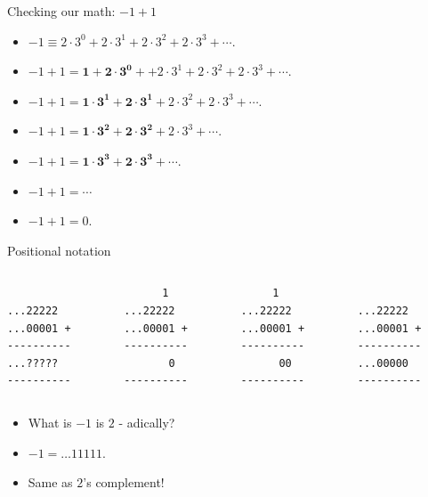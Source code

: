 \documentclass[8pt]{beamer}
\begin{document}
\begin{frame}[fragile]{Checking our math: $-1 + 1$}

\begin{itemize}
\item $-1 \equiv 2\cdot 3^0 + 2\cdot 3^1 + 2 \cdot 3^2 + 2 \cdot 3^3 + \cdots$. \pause
\item $-1 +1 = \mathbf{1 + 2\cdot 3^0} +   + 2\cdot 3^1 + 2 \cdot 3^2 + 2 \cdot 3^3 + \cdots$. \pause
\item $-1 +1 = \mathbf{1 \cdot 3^1 + 2\cdot 3^1} + 2 \cdot 3^2 + 2 \cdot 3^3 + \cdots$. \pause
\item $-1 +1 = \mathbf{1\cdot 3^2 + 2 \cdot 3^2} + 2 \cdot 3^3 + \cdots$. \pause
\item $-1 +1 = \mathbf{1\cdot 3^3 + 2 \cdot 3^3} + \cdots$. \pause
\item $-1 +1 = \cdots$ \pause
\item $-1 +1 = 0$.
\end{itemize}
\end{frame}
\begin{frame}[fragile]{Positional notation}

\begin{columns}%
\begin{column}{.23\textwidth}
\begin{verbatim}

...22222
...00001 + 
----------
...?????
----------
\end{verbatim}
\end{column}
%
\begin{column}{.23\textwidth}
\pause
\begin{verbatim}
      1
...22222
...00001 + 
----------
       0
----------
\end{verbatim}
\end{column}
%
\begin{column}{.23\textwidth} 
\pause
\begin{verbatim}
     1 
...22222
...00001 + 
----------
      00
----------
\end{verbatim}
\end{column}
%
\begin{column}{.23\textwidth} 
\pause
\begin{verbatim}
      
...22222
...00001 + 
----------
...00000
----------
\end{verbatim}
\end{column}
\end{columns}
\pause

\begin{itemize}
\item What is $-1$ is $2$ - adically? \pause
\item $-1 = \dots 11111$. \pause
\item Same as $2$'s complement!
\end{itemize}
\end{frame}
\end{document}
